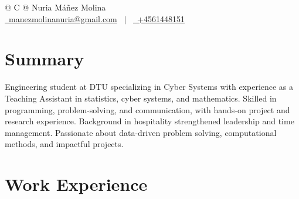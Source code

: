 \documentclass[a4paper,12pt]{article}
\begin{document}
\pagestyle{empty} 



\begin{tabularx}{\linewidth}{@{} C @{}}
\Huge{Nuria Máñez Molina} \\[7.5pt]
\href{mailto:manezmolinanuria@gmail.com}{\raisebox{-0.05\height}\faEnvelope \ manezmolinanuria@gmail.com} \ $|$ \ 
\href{tel:+4561448151}{\raisebox{-0.05\height}\faMobile \ +4561448151} \\
\end{tabularx}


\section{Summary}
Engineering student at DTU specializing in Cyber Systems with experience as a Teaching Assistant in statistics, cyber systems, and mathematics. Skilled in programming, problem-solving, and communication, with hands-on project and research experience. Background in hospitality strengthened leadership and time management. Passionate about data-driven problem solving, computational methods, and impactful projects.

\section{Work Experience}
\end{document}
